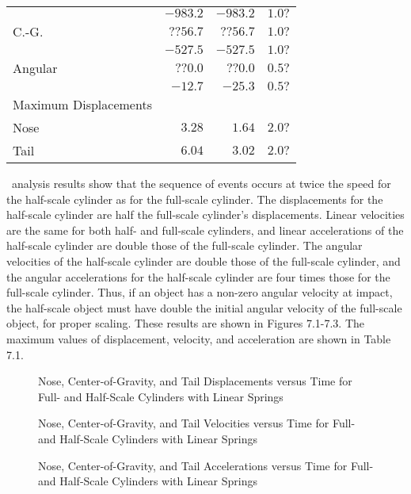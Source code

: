 \begin{table}
\begin{center}
\begin{tabular}{||l|r|r|r||}
                  &$-983.2$ &$-983.2$ &$1.0?$\\
\quad    C.-G.            &$??56.7$ &$??56.7$  &$1.0?$\\
                     &$-527.5$ &$-527.5$  &$1.0?$\\
\quad    Angular            &$??0.0$ &$??0.0$ &$0.5?$\\
                       &$-12.7$ &$-25.3$ &$0.5?$\\
Maximum Displacements & & & \\
\quad    Nose            &$3.28$ &$1.64$ &$2.0?$\\
\quad    Tail            &$6.04$ &$3.02$ &$2.0?$\\
\hline
\end{tabular}
\end{center}
\end{table}

     \SLAP\ analysis results show that the sequence of
events occurs at twice the speed for the half-scale cylinder 
as for the
full-scale cylinder.  The displacements for the half-scale cylinder
are half the full-scale cylinder's
displacements.
Linear velocities are the same for
both half- and full-scale cylinders, and linear accelerations of the 
half-scale cylinder are double those of the full-scale cylinder.
The angular
velocities of the half-scale cylinder are double those of the full-scale
cylinder, and the angular accelerations for 
the half-scale cylinder are four times those
for the full-scale cylinder.  
Thus, if an object has a non-zero angular velocity
at impact, the half-scale object must have
double the initial angular velocity of the full-scale object, 
for proper scaling.  These
results are shown in Figures 7.1-7.3.  The maximum values of
displacement, velocity, and acceleration are shown in Table 7.1.

\begin{figure}
\vspace{3.5 in}
\caption{Nose, Center-of-Gravity, and Tail Displacements versus Time 
for Full- and Half-Scale Cylinders with Linear Springs}
\end{figure}

\begin{figure}
\vspace{3.5 in}
\caption{Nose, Center-of-Gravity, and Tail Velocities versus Time 
for Full- and Half-Scale Cylinders with Linear Springs}
\end{figure}

\begin{figure}
\vspace{3.5 in}
\caption{Nose, Center-of-Gravity, and Tail Accelerations versus Time 
for Full- and Half-Scale Cylinders with Linear Springs}
\end{figure}

